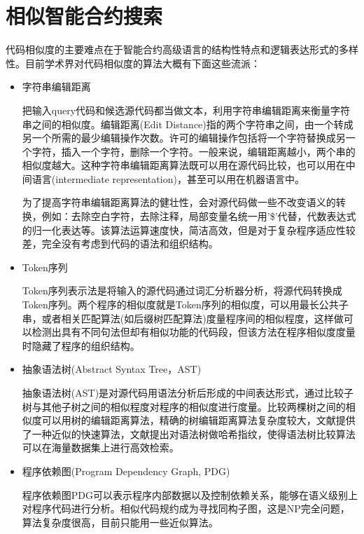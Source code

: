 \section{相似智能合约搜索}
\label{appendix:sim_code}

代码相似度的主要难点在于智能合约高级语言的结构性特点和逻辑表达形式的多样性。目前学术界对代码相似度的算法大概有下面这些流派：
\begin{itemize}
	\item 字符串编辑距离

把输入query代码和候选源代码都当做文本，利用字符串编辑距离来衡量字符串之间的相似度。编辑距离(Edit Distance)指的两个字符串之间，由一个转成另一个所需的最少编辑操作次数。许可的编辑操作包括将一个字符替换成另一个字符，插入一个字符，删除一个字符。一般来说，编辑距离越小，两个串的相似度越大。这种字符串编辑距离算法既可以用在源代码比较，也可以用在中间语言(intermediate representation)，甚至可以用在机器语言中。

为了提高字符串编辑距离算法的健壮性，会对源代码做一些不改变语义的转换，例如：去除空白字符，去除注释，局部变量名统一用'\$'代替，代数表达式的归一化表达等。该算法运算速度快，简洁高效，但是对于复杂程序适应性较差，完全没有考虑到代码的语法和组织结构。

	\item Token序列

Token序列表示法是将输入的源代码通过词汇分析器分析，将源代码转换成Token序列。两个程序的相似度就是Token序列的相似度，可以用最长公共子串，或者相关匹配算法(如后缀树匹配算法)度量程序间的相似程度，这样做可以检测出具有不同句法但却有相似功能的代码段，但该方法在程序相似度度量时隐藏了程序的组织结构。

	\item 抽象语法树(Abstract Syntax Tree，AST)
	
抽象语法树(AST)是对源代码用语法分析后形成的中间表达形式，通过比较子树与其他子树之间的相似程度对程序的相似度进行度量。比较两棵树之间的相似度可以用树的编辑距离算法\cite{zhang1989simple}，精确的树编辑距离算法复杂度较大，文献\cite{guha2002approximate}提供了一种近似的快速算法，文献\cite{chilowicz2009syntax}提出对语法树做哈希指纹，使得语法树比较算法可以在海量数据集上进行高效检索。

	\item 程序依赖图(Program Dependency Graph, PDG)

程序依赖图PDG\cite{ferrante1987program}可以表示程序内部数据以及控制依赖关系，能够在语义级别上对程序代码进行分析。相似代码规约成为寻找同构子图，这是NP完全问题，算法复杂度很高，目前只能用一些近似算法。

\end{itemize}

